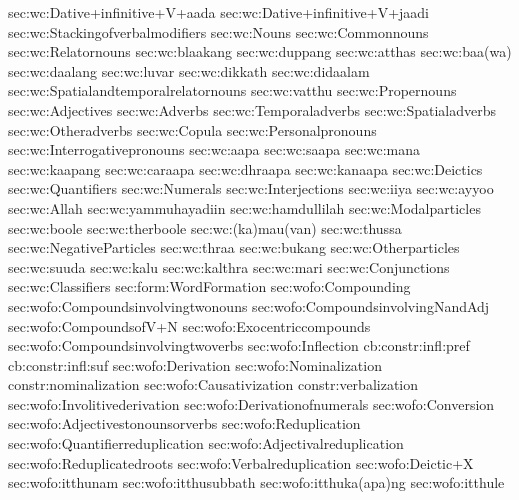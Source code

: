 {sec:wc:Dative+infinitive+V+aada}
{sec:wc:Dative+infinitive+V+jaadi}
{sec:wc:Stackingofverbalmodifiers}
{sec:wc:Nouns}
{sec:wc:Commonnouns}
{sec:wc:Relatornouns}
{sec:wc:blaakang}
{sec:wc:duppang}
{sec:wc:atthas}
{sec:wc:baa(wa)}
{sec:wc:daalang}
{sec:wc:luvar}
{sec:wc:dikkath}
{sec:wc:didaalam}
{sec:wc:Spatialandtemporalrelatornouns}
{sec:wc:vatthu}
{sec:wc:Propernouns}
{sec:wc:Adjectives}
{sec:wc:Adverbs}
{sec:wc:Temporaladverbs}
{sec:wc:Spatialadverbs}
{sec:wc:Otheradverbs}
{sec:wc:Copula}
{sec:wc:Personalpronouns}
{sec:wc:Interrogativepronouns}
{sec:wc:aapa}
{sec:wc:saapa}
{sec:wc:mana}
{sec:wc:kaapang}
{sec:wc:caraapa}
{sec:wc:dhraapa}
{sec:wc:kanaapa}
{sec:wc:Deictics}
{sec:wc:Quantifiers}
{sec:wc:Numerals}
{sec:wc:Interjections}
{sec:wc:iiya}
{sec:wc:ayyoo}
{sec:wc:Allah}
{sec:wc:yammuhayadiin}
{sec:wc:hamdullilah}
{sec:wc:Modalparticles}
{sec:wc:boole}
{sec:wc:therboole}
{sec:wc:(ka)mau(van)}
{sec:wc:thussa}
{sec:wc:NegativeParticles}
{sec:wc:thraa}
{sec:wc:bukang}
{sec:wc:Otherparticles}
{sec:wc:suuda}
{sec:wc:kalu}
{sec:wc:kalthra}
{sec:wc:mari}
{sec:wc:Conjunctions}
{sec:wc:Classifiers}
{sec:form:WordFormation}
{sec:wofo:Compounding}
{sec:wofo:Compoundsinvolvingtwonouns}
{sec:wofo:CompoundsinvolvingNandAdj}
{sec:wofo:CompoundsofV+N}
{sec:wofo:Exocentriccompounds}
{sec:wofo:Compoundsinvolvingtwoverbs}
{sec:wofo:Inflection}
{cb:constr:infl:pref}
{cb:constr:infl:suf}
{sec:wofo:Derivation}
{sec:wofo:Nominalization}
{constr:nominalization}
{sec:wofo:Causativization}
{constr:verbalization}
{sec:wofo:Involitivederivation}
{sec:wofo:Derivationofnumerals}
{sec:wofo:Conversion}
{sec:wofo:Adjectivestonounsorverbs}
{sec:wofo:Reduplication}
{sec:wofo:Quantifierreduplication}
{sec:wofo:Adjectivalreduplication}
{sec:wofo:Reduplicatedroots}
{sec:wofo:Verbalreduplication}
{sec:wofo:Deictic+X}
{sec:wofo:itthunam}
{sec:wofo:itthusubbath}
{sec:wofo:itthuka(apa)ng}
{sec:wofo:itthule}
